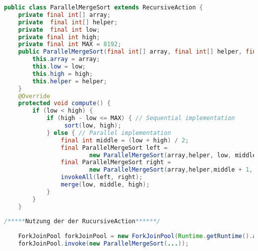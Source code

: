 \begin{lstlisting}[language=java,caption={paralleler Mergesort (Quelle: \cite{MergeSortParallel})},label=lst:MergeSortParallel]
public class ParallelMergeSort extends RecursiveAction {
    private final int[] array;
    private  final int[] helper;
    private  final int low;
    private final int high;
    private final int MAX = 8192;
    public ParallelMergeSort(final int[] array, final int[] helper, final int low, final int high){
        this.array = array;
        this.low = low;
        this.high = high;
        this.helper = helper;
    }
    @Override
    protected void compute() {
        if (low < high) {
            if (high - low <= MAX) { // Sequential implementation
                 sort(low, high);
            } else { // Parallel implementation
                final int middle = (low + high) / 2;
                final ParallelMergeSort left =
                        new ParallelMergeSort(array,helper, low, middle);
                final ParallelMergeSort right =
                        new ParallelMergeSort(array,helper,middle + 1, high);
                invokeAll(left, right);
                merge(low, middle, high);
            }
        }
    } 
    
/*****Nutzung der der RucursiveAction******/
    
    ForkJoinPool forkJoinPool = new ForkJoinPool(Runtime.getRuntime().availableProcessors() - 1);
    forkJoinPool.invoke(new ParallelMergeSort(...));
\end{lstlisting}